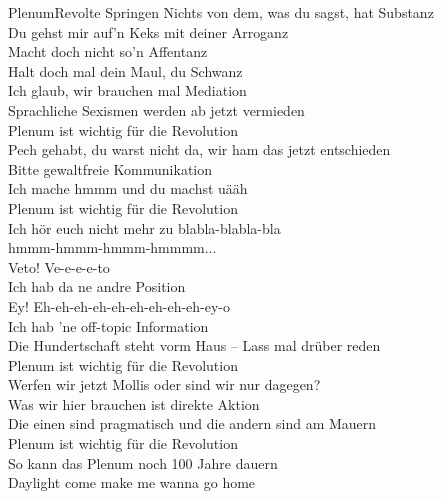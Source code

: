 \begin{lied}{Plenum}{Revolte Springen}
Nichts von dem, was du sagst, hat Substanz\\
Du gehst mir auf'n Keks mit deiner Arroganz\\
Macht doch nicht so'n Affentanz\\
Halt doch mal dein Maul, du Schwanz\\
Ich glaub, wir brauchen mal Mediation\\
\vspace{1em}
Sprachliche Sexismen werden ab jetzt vermieden\\
Plenum ist wichtig für die Revolution\\
Pech gehabt, du warst nicht da, wir ham das jetzt entschieden\\
Bitte gewaltfreie Kommunikation\\
\vspace{1em}
Ich mache hmmm und du machst uääh\\
Plenum ist wichtig für die Revolution\\
Ich hör euch nicht mehr zu blabla-blabla-bla\\
hmmm-hmmm-hmmm-hmmmm...\\
\vspace{1em}
Veto! Ve-e-e-e-to 	\\
Ich hab da ne andre Position\\
Ey! Eh-eh-eh-eh-eh-eh-eh-eh-eh-ey-o\\
Ich hab 'ne off-topic Information\\
\vspace{1em}
Die Hundertschaft steht vorm Haus -- Lass mal drüber reden\\
Plenum ist wichtig für die Revolution\\
Werfen wir jetzt Mollis oder sind wir nur dagegen?\\
Was wir hier brauchen ist direkte Aktion\\
\vspace{1em}
Die einen sind pragmatisch und die andern sind am Mauern\\
Plenum ist wichtig für die Revolution\\
So kann das Plenum noch 100 Jahre dauern\\
Daylight come make me wanna go home\\
\end{lied}


